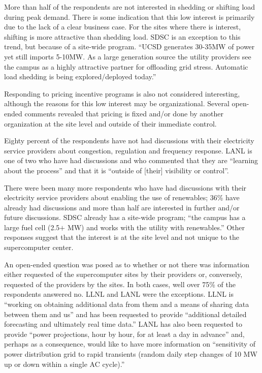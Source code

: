 \documentclass{llncs}
\begin{document}
More than half of the respondents are not interested in shedding or shifting
load during peak demand. There is some indication that this low interest is
primarily due to the lack of a clear business case. For the sites where
there is interest, shifting is more attractive than shedding load. SDSC is
an exception to this trend, but because of a site-wide program. ``UCSD
generates 30-35MW of power yet still imports 5-10MW. As a large generation
source the utility providers see the campus as a highly attractive partner
for offloading grid stress. Automatic load shedding is being
explored/deployed today.''

Responding to pricing incentive programs is also not considered interesting,
although the reasons for this low interest may be organizational. Several
open-ended comments revealed that pricing is fixed and/or done by another
organization at the site level and outside of their immediate control.

Eighty percent of the respondents have not had discussions with their
electricity service providers about congestion, regulation and frequency
response. LANL is one of two who have had discussions and who commented that
they are ``learning about the process'' and that it is ``outside of [their]
visibility or control''.

There were been many more respondents who have had discussions with their
electricity service providers about enabling the use of renewables; 36{\%}
have already had discussions and more than half are interested in further
and/or future discussions. SDSC already has a site-wide program; ``the
campus has a large fuel cell (2.5$+$ MW) and works with the utility with
renewables.'' Other responses suggest that the interest is at the site level
and not unique to the supercomputer center.

An open-ended question was posed as to whether or not there was information
either requested of the supercomputer sites by their providers or,
conversely, requested of the providers by the sites. In both cases, well
over 75{\%} of the respondents answered no. LLNL and LANL were the
exceptions. LLNL is ``working on obtaining additional data from them and a
means of sharing data between them and us'' and has been requested to
provide ``additional detailed forecasting and ultimately real time data.''
LANL has also been requested to provide ``power projections, hour by hour,
for at least a day in advance'' and, perhaps as a consequence, would like to
have more information on ``sensitivity of power distribution grid to rapid
transients (random daily step changes of 10 MW up or down within a single AC
cycle).''
\end{document}
